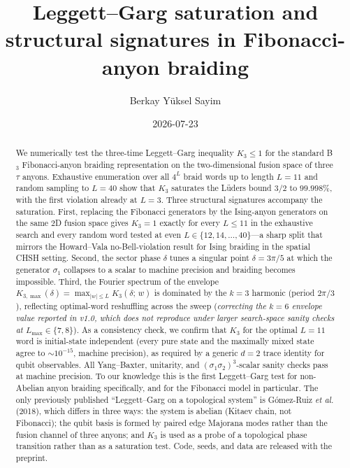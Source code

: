\documentclass[aps,prx,reprint,amsmath,amssymb,floatfix,nofootinbib,superscriptaddress]{revtex4-2}
\begin{document}
\setcounter{secnumdepth}{3} %

\title{Leggett--Garg saturation and structural signatures in Fibonacci-anyon braiding}

\author{Berkay Y\"uksel Sayim}

\date{2026-07-23}

\begin{abstract}
We numerically test the three-time Leggett--Garg inequality
$K_{3} \leq 1$ for the standard B$_{3}$ Fibonacci-anyon braiding
representation on the two-dimensional fusion space of three $\tau$ anyons.
Exhaustive enumeration over all $4^{L}$ braid words up to length $L=11$
and random sampling to $L=40$ show that $K_{3}$ saturates the L\"uders
bound $3/2$ to $99.998\%$, with the first violation already at $L=3$.
Three structural signatures accompany the saturation. First, replacing
the Fibonacci generators by the Ising-anyon generators on the same
$2$D fusion space gives $K_{3}=1$ exactly for every $L\leq11$ in the
exhaustive search and every random word tested at even
$L\in\{12,14,\ldots,40\}$---a sharp split that mirrors the Howard--Vala
no-Bell-violation result for Ising braiding in the spatial CHSH setting.
Second, the sector phase $\delta$ tunes a singular point
$\delta = 3\pi/5$ at which the generator $\sigma_{1}$ collapses to a
scalar to machine precision and braiding becomes impossible.
Third, the Fourier spectrum of the envelope
$K_{3,\max}(\delta) = \max_{|w| \leq L} K_{3}(\delta;\,w)$ is
dominated by the $k=3$ harmonic (period $2\pi/3$),
reflecting optimal-word reshuffling across the sweep
(\emph{correcting the $k=6$ envelope value reported in v1.0,
which does not reproduce under larger search-space sanity checks
at $L_{\max} \in \{7, 8\}$}). As a consistency check, we confirm that
$K_{3}$ for the optimal $L=11$ word is initial-state independent
(every pure state and the maximally mixed state agree to
$\sim 10^{-15}$, machine precision),
as required by a generic $d=2$ trace identity for qubit observables.
All Yang--Baxter, unitarity, and $(\sigma_{1}\sigma_{2})^{3}$-scalar
sanity checks pass at machine precision. To our knowledge this is the
first Leggett--Garg test for non-Abelian anyon braiding specifically,
and for the Fibonacci model in particular. The only previously
published ``Leggett--Garg on a topological system'' is
G\'omez-Ruiz \emph{et al.} (2018), which differs in three ways: the
system is abelian (Kitaev chain, not Fibonacci); the qubit basis is
formed by paired edge Majorana modes rather than the fusion channel
of three anyons; and $K_{3}$ is used as a probe of a topological
phase transition rather than as a saturation test. Code,
seeds, and data are released with the preprint.
\end{abstract}
\end{document}
